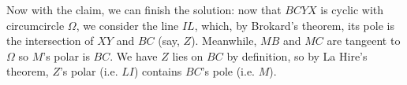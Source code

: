 \documentclass[11pt,a4paper]{article}
\begin{document}
\begin{enumerate}
	Now with the claim, we can finish the solution: now that $BCYX$ is cyclic with circumcircle $\Omega$, we consider the line $IL$, which, by Brokard's theorem, its pole is the intersection of $XY$ and $BC$ (say, $Z$). Meanwhile, $MB$ and $MC$ are tangeent to $\Omega$ so $M$'s polar is $BC$. We have $Z$ lies on $BC$ by definition, so by La Hire's theorem, $Z$'s polar (i.e. $LI$) contains $BC$'s pole (i.e. $M$). 
\end{enumerate}
\end{document}
